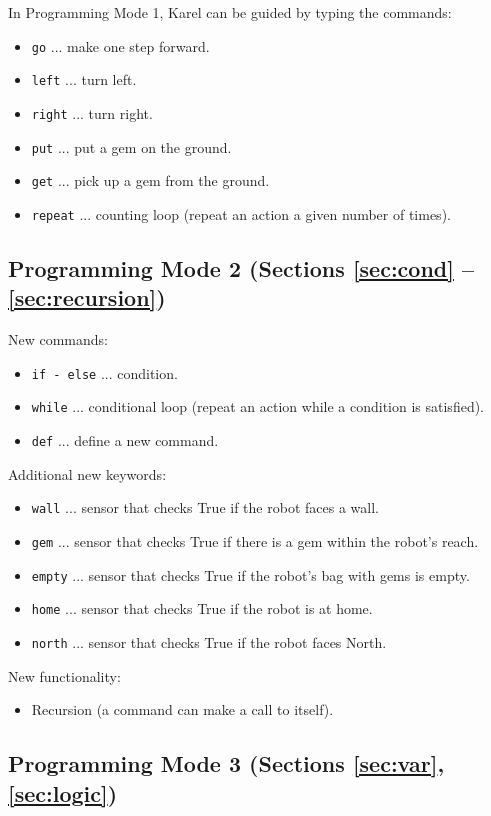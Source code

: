 In Programming Mode 1, Karel can be guided by typing the commands:
\begin{itemize}
\item {\tt go} ... make one step forward.
\item {\tt left} ... turn left.
\item {\tt right} ... turn right.
\item {\tt put} ... put a gem on the ground.
\item {\tt get} ... pick up a gem from the ground.
\item {\tt repeat} ... counting loop (repeat an action a given number of times).
\end{itemize}

\subsection[\ \ Programming Mode 2 (Sections \ref{sec:cond} -- \ref{sec:recursion})]{Programming Mode 2 (Sections \ref{sec:cond} -- \ref{sec:recursion})}

New commands:
\begin{itemize}
\item {\tt if - else} ... condition.
\item {\tt while} ... conditional loop (repeat an action while a condition is satisfied).
\item {\tt def} ... define a new command.
\end{itemize}
Additional new keywords:
\begin{itemize}
\item {\tt wall} ... sensor that checks True if the robot faces a wall.
\item {\tt gem} ... sensor that checks True if there is a gem within the robot's reach.
\item {\tt empty} ... sensor that checks True if the robot's bag with gems is empty.
\item {\tt home} ... sensor that checks True if the robot is at home.
\item {\tt north} ... sensor that checks True if the robot faces North.
\end{itemize}
New functionality:
\begin{itemize}
\item Recursion (a command can make a call to itself).
\end{itemize}

\subsection[\ \ Programming Mode 3 (Sections \ref{sec:var}, \ref{sec:logic})]{Programming Mode 3 (Sections \ref{sec:var}, \ref{sec:logic})}

